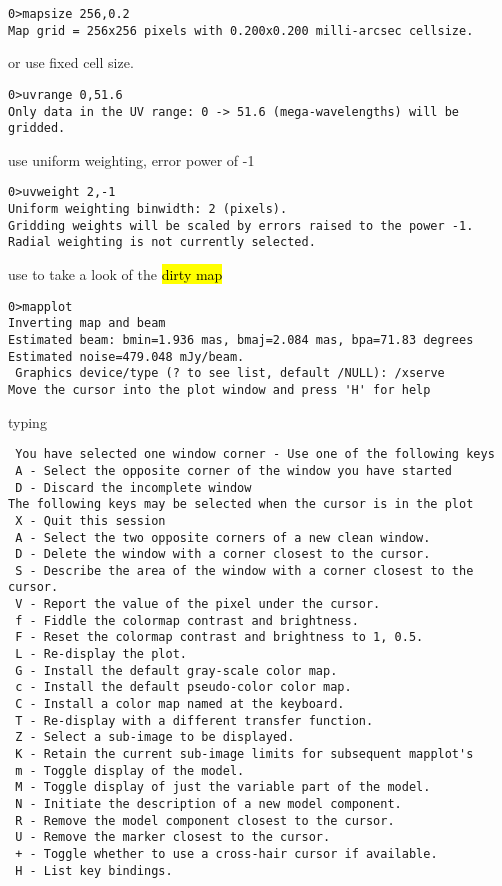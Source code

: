 \documentclass[a4paper,11pt]{article}
\begin{document}
\scriptsize
\begin{lstlisting}
0>mapsize 256,0.2
Map grid = 256x256 pixels with 0.200x0.200 milli-arcsec cellsize.
\end{lstlisting}
\normalsize
\par or use fixed cell size.
\scriptsize
\begin{lstlisting}
0>uvrange 0,51.6
Only data in the UV range: 0 -> 51.6 (mega-wavelengths) will be gridded.
\end{lstlisting}
\normalsize
use uniform weighting, error power of -1
\scriptsize
\begin{lstlisting}
0>uvweight 2,-1
Uniform weighting binwidth: 2 (pixels).
Gridding weights will be scaled by errors raised to the power -1.
Radial weighting is not currently selected.
\end{lstlisting}
\normalsize
use  to take a look of the \hl{dirty map}
\scriptsize
\begin{lstlisting}
0>mapplot
Inverting map and beam 
Estimated beam: bmin=1.936 mas, bmaj=2.084 mas, bpa=71.83 degrees
Estimated noise=479.048 mJy/beam.
 Graphics device/type (? to see list, default /NULL): /xserve
Move the cursor into the plot window and press 'H' for help
 \end{lstlisting}
 \normalsize
typing 
 \scriptsize
\begin{lstlisting}
 You have selected one window corner - Use one of the following keys
 A - Select the opposite corner of the window you have started
 D - Discard the incomplete window
The following keys may be selected when the cursor is in the plot
 X - Quit this session
 A - Select the two opposite corners of a new clean window.
 D - Delete the window with a corner closest to the cursor.
 S - Describe the area of the window with a corner closest to the cursor.
 V - Report the value of the pixel under the cursor.
 f - Fiddle the colormap contrast and brightness.
 F - Reset the colormap contrast and brightness to 1, 0.5.
 L - Re-display the plot.
 G - Install the default gray-scale color map.
 c - Install the default pseudo-color color map.
 C - Install a color map named at the keyboard.
 T - Re-display with a different transfer function.
 Z - Select a sub-image to be displayed.
 K - Retain the current sub-image limits for subsequent mapplot's
 m - Toggle display of the model.
 M - Toggle display of just the variable part of the model.
 N - Initiate the description of a new model component.
 R - Remove the model component closest to the cursor.
 U - Remove the marker closest to the cursor.
 + - Toggle whether to use a cross-hair cursor if available.
 H - List key bindings.
 \end{lstlisting}
\end{document}
